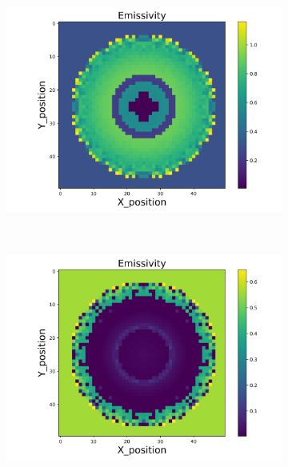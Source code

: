 \begin{figure}[p]
\begin{minipage}{\textwidth}
\begin{subfigure}{0.325\textwidth}
            \includegraphics[width=\textwidth]{figures/raw_data/31/linear/emi_cal.jpg}
        \end{subfigure}
    \end{minipage}\\
    \begin{minipage}{\textwidth}
        \centering
        \begin{subfigure}{0.325\textwidth}
            \centering
            \includegraphics[width=\textwidth]{figures/raw_data/32/linear/emi_cal.jpg}
        \end{subfigure}
        \begin{subfigure}{0.325\textwidth}

\end{subfigure}
\end{minipage}
\end{figure}

